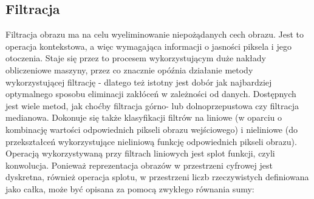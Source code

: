 \subsection{Filtracja}
Filtracja obrazu ma na celu wyeliminowanie niepożądanych cech obrazu. Jest to operacja kontekstowa, a więc wymagająca informacji o jasności piksela i jego otoczenia. Staje się przez to procesem wykorzystującym duże nakłady obliczeniowe maszyny, przez co znacznie opóźnia działanie metody wykorzystującej filtrację - dlatego też istotny jest dobór jak najbardziej optymalnego sposobu eliminacji zakłóceń w zależności od danych. Dostępnych jest wiele metod, jak choćby filtracja górno- lub dolnoprzepustowa czy filtracja medianowa. Dokonuje się także klasyfikacji filtrów na liniowe (w oparciu o kombinację wartości odpowiednich pikseli obrazu wejściowego) i nieliniowe (do przekształceń wykorzystujące nieliniową funkcję odpowiednich pikseli obrazu). 
Operacją wykorzystywaną przy filtrach liniowych jest splot funkcji, czyli konwolucja. Ponieważ reprezentacja obrazów w przestrzeni cyfrowej jest dyskretna, również operacja splotu, w przestrzeni liczb rzeczywistych definiowana jako całka, może być opisana za pomocą zwykłego równania sumy:
